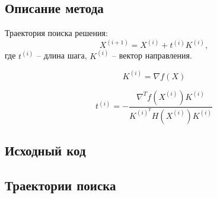 \subsection{Описание метода}

Траектория поиска решения:
\begin{equation*}
X^{(i+1)}  = X^{(i)} + t^{(i)} K^{(i)},
\end{equation*}
где $t^{(i)}$ -- длина шага, $K^{(i)}$ -- вектор направления.

\begin{equation*}
K^{(i)} = \nabla f(X)
\end{equation*}

\begin{equation*}
t^{(i)} = -\dfrac{\nabla^T f\left(X^{(i)}\right) K^{(i)}}{K^{(i)^T} H\left(X^{(i)}\right) K^{(i)}}
\end{equation*}

%
%
%
%
%

\subsection{Исходный код}



\subsection{Траектории поиска}

